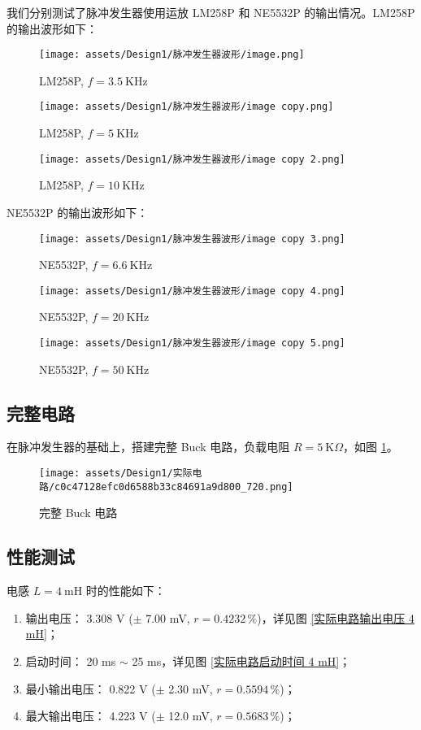 \documentclass[UTF8]{article}
\def\kO{\ \mathrm{K}\Omega}
\def\kO{\ \mathrm{K}\Omega}
\theoremstyle{MyLineTheoremStyle} %
\theoremstyle{MyBlockTheoremStyle} %
\theoremstyle{MySubsubsectionStyle} %
\begin{document}
我们分别测试了脉冲发生器使用运放 LM258P 和 NE5532P 的输出情况。LM258P 的输出波形如下：
\begin{figure}[H]\centering
    \texttt{[image: assets/Design1/脉冲发生器波形/image.png]}
    \caption{ LM258P, $f = 3.5 \ \mathrm{KHz}$}
\end{figure}
\begin{figure}[H]\centering
    \texttt{[image: assets/Design1/脉冲发生器波形/image copy.png]}
    \caption{LM258P, $f = 5 \ \mathrm{KHz}$}
\end{figure}
\begin{figure}[H]\centering
    \texttt{[image: assets/Design1/脉冲发生器波形/image copy 2.png]}
    \caption{LM258P, $f = 10 \ \mathrm{KHz}$}
\end{figure}

NE5532P 的输出波形如下：
\begin{figure}[H]\centering
    \texttt{[image: assets/Design1/脉冲发生器波形/image copy 3.png]}
    \caption{NE5532P, $f = 6.6 \ \mathrm{KHz}$}
\end{figure}
\begin{figure}[H]\centering
    \texttt{[image: assets/Design1/脉冲发生器波形/image copy 4.png]}
    \caption{NE5532P, $f = 20 \ \mathrm{KHz}$}
\end{figure}
\begin{figure}[H]\centering
    \texttt{[image: assets/Design1/脉冲发生器波形/image copy 5.png]}
    \caption{NE5532P, $f = 50 \ \mathrm{KHz}$}
\end{figure}

\subsection{完整电路}
在脉冲发生器的基础上，搭建完整 Buck 电路，负载电阻 $R = 5 \kO$，如图 \ref{完整 Buck 电路}。
\begin{figure}[H]\centering
    \texttt{[image: assets/Design1/实际电路/c0c47128efc0d6588b33c84691a9d800\_720.png]}
    \caption{完整 Buck 电路}
    \label{完整 Buck 电路}
\end{figure}

\subsection{性能测试}
\noindent 电感 $L = 4 \ \mathrm{mH}$ 时的性能如下：
\begin{enumerate}
\item 输出电压： 3.308 V ($\pm$ 7.00 mV, $r = 0.4232 \,\%$)，详见图 \ref{实际电路输出电压 4 mH}；
    \item 启动时间： 20 ms $\sim$ 25 ms，详见图 \ref{实际电路启动时间 4 mH}；
\item 最小输出电压： 0.822 V ($\pm$ 2.30 mV, $r = 0.5594 \,\%$)；
\item 最大输出电压： 4.223 V ($\pm$ 12.0 mV, $r = 0.5683 \,\%$)；
\end{enumerate}
\end{document}
